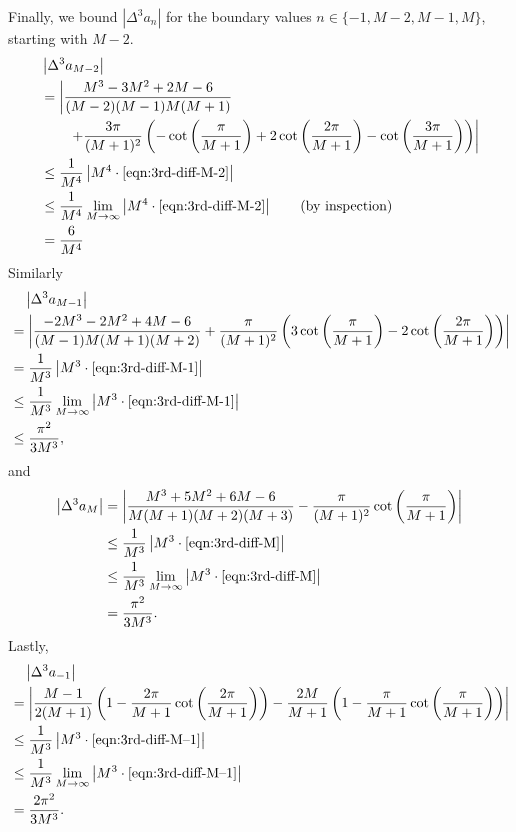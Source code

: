 \documentclass[11pt,letterpaper,reqno]{amsart}
\theoremstyle{definition}
\numberwithin{equation}{section}
\numberwithin{figure}{section}
\numberwithin{table}{section}
\begin{document}
Finally, we bound $\left| \Delta^3 a_n \right|$ for the boundary values $n \in \{-1, M - 2, M - 1, M\}$, starting with $M - 2.$
\begin{align}
    & \left| \Delta^3 a_{M - 2} \right| \\
    &= \left| \frac{M^3 - 3M^2 + 2 M - 6}{(M - 2)(M - 1)M(M+1)} \right.\\
    & \qquad\left. + \frac{3\pi}{(M + 1)^2}\left( - \cot \left( \frac{\pi}{M + 1} \right)  + 2 \cot \left(\frac{2\pi}{M + 1} \right) - \cot \left( \frac{3\pi}{M + 1} \right)  \right) \right| \label{eqn:3rd-diff-M-2}\\
    &\leq \frac{1}{M^4} \left| M^4 \cdot \eqref{eqn:3rd-diff-M-2} \right|\\
    &\leq \frac{1}{M^4} \lim_{M \rightarrow \infty} \left| M^4 \cdot \eqref{eqn:3rd-diff-M-2} \right| \qquad \text{(by inspection)}\\
    &= \frac{6}{M^4}
\end{align}
Similarly
\begin{align}
    & \quad \left| \Delta^3 a_{M - 1} \right| \\
    &= \left| \frac{- 2M^3 - 2M^2 + 4 M - 6}{(M - 1)M(M + 1)(M+2)} + \frac{\pi}{(M + 1)^2}\left( 3\cot \left( \frac{\pi}{M + 1} \right) - 2 \cot \left(\frac{2\pi}{M + 1} \right) \right) \right| \label{eqn:3rd-diff-M-1}\\
    &= \frac{1}{M^3}   \left| M^3 \cdot  \eqref{eqn:3rd-diff-M-1} \right|\\
    &\leq \frac{1}{M^3}  \lim_{M \rightarrow \infty} \left| M^3 \cdot  \eqref{eqn:3rd-diff-M-1} \right|\\
    &\leq \frac{\pi^2}{3 M^3},
\end{align}
and
\begin{align}
    \left| \Delta^3 a_M \right| &= \left| \frac{M^3 + 5M^2 + 6M - 6}{M(M + 1)(M + 2)(M + 3)} - \frac{\pi}{(M + 1)^2} \cot \left( \frac{\pi}{M + 1}  \right) \right|  \label{eqn:3rd-diff-M}\\
    &\leq \frac{1}{M^3} \left| M^3 \cdot \eqref{eqn:3rd-diff-M} \right|\\
    &\leq \frac{1}{M^3} \lim_{M \rightarrow \infty }\left| M^3 \cdot \eqref{eqn:3rd-diff-M} \right|\\
    &= \frac{\pi^2}{3M^3}.
\end{align}
Lastly,
\begin{align}
    & \quad \left| \Delta^3 a_{-1} \right|\\
    &= \left| \frac{M - 1}{2(M + 1)} \left( 1 - \frac{2\pi}{M + 1} \cot \left( \frac{2\pi}{M + 1 } \right)\right) - \frac{2M}{M + 1} \left(1 - \frac{\pi}{M + 1} \cot\left( \frac{\pi}{M + 1} \right) \right) \right|  \label{eqn:3rd-diff-M--1}\\
    &\leq \frac{1}{M^3} \left| M^3 \cdot \eqref{eqn:3rd-diff-M--1} \right|\\
    &\leq \frac{1}{M^3} \lim_{M \rightarrow \infty }\left| M^3 \cdot \eqref{eqn:3rd-diff-M--1} \right|\\
    &= \frac{2\pi^2}{3  M^3}.
\end{align}
\end{document}
